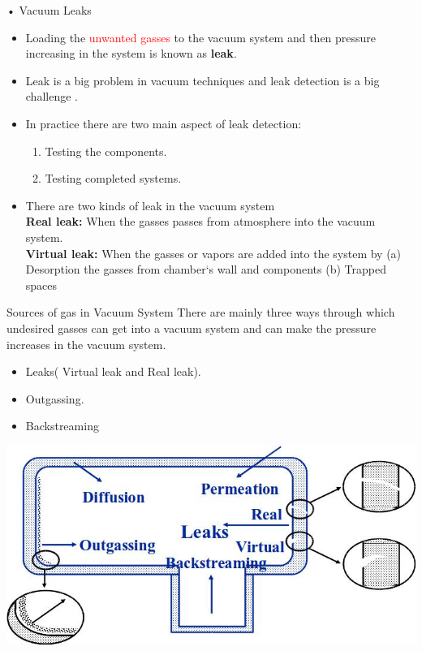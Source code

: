 \documentclass[11pt]{beamer}
\begin{document}
\begin{frame}{• Vacuum Leaks}

\begin{itemize}
\item Loading the \textcolor{red}{ unwanted gasses} to the vacuum system and then pressure increasing in the system is known as \textbf{leak}.
\item Leak is a big problem in vacuum techniques and leak detection is a big challenge .
\item In practice there are two main aspect of leak detection:
    \begin{enumerate}
       \item  Testing the components.
	   \item Testing completed systems.
    \end{enumerate}

\item There are two kinds of leak in the vacuum system \\
\textbf{Real leak:} When the gasses passes from atmosphere into the vacuum system.\\
\textbf{Virtual leak:} When the gasses or vapors are added into the system by 
	(a) Desorption the gasses from chamber`s  wall and components
	(b) Trapped spaces




\end{itemize}


\end{frame}

\begin{frame}{Sources of gas in Vacuum System}
There are mainly three ways through which undesired gasses can get into a vacuum system and can make the pressure increases in the vacuum system.
\begin{itemize}
\item Leaks( Virtual leak and Real leak).
\item Outgassing.
\item Backstreaming
\end{itemize}

\begin{center}
\includegraphics[scale=0.4]{leaksources.jpg}
\end{center}




\end{frame}
\end{document}
